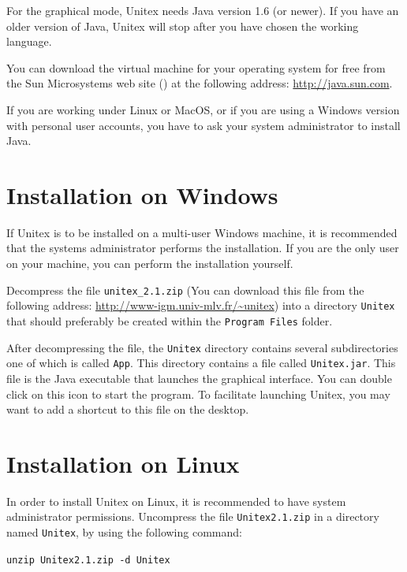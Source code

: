 \bigskip
\noindent For the graphical mode, Unitex needs Java version 1.6 (or newer). If you have an
older version of Java, Unitex will stop after you have chosen the working
language.

\bigskip
\noindent You can download the virtual machine for your operating system for free from the
Sun Microsystems web site (\cite{site-java}) at the following address:
\url{http://java.sun.com}.

\bigskip
\noindent If you are working under Linux or MacOS, or if you are using a Windows version
with personal user accounts, you have to ask your system administrator to install
Java.


\section{Installation on Windows}
If Unitex is to be installed on a multi-user Windows machine, it is recommended
that the systems administrator performs the installation. If you are the only
user on your machine, you can perform the installation  yourself.

\bigskip
\noindent Decompress the file  \verb+unitex_2.1.zip+ (You
can download this file from the following address:
\url{http://www-igm.univ-mlv.fr/~unitex}) into a directory \verb+Unitex+ that
should preferably be created within the \verb+Program Files+ folder.

\bigskip
\noindent After decompressing the file, the \verb+Unitex+ directory contains several
subdirectories  one  of which is called \verb+App+. This directory contains a
file called \verb+Unitex.jar+.  This file is the
Java executable that launches the graphical interface. You can double click on
this icon to start the program. To facilitate launching Unitex, you may want to
add a shortcut to this file on the desktop.




\section{Installation on Linux}
In order to install Unitex on Linux, it is recommended to have system
administrator permissions. Uncompress the file \verb+Unitex2.1.zip+ in a
directory named \verb+Unitex+, by using the following command:

\bigskip \noindent \verb$unzip Unitex2.1.zip -d Unitex$

